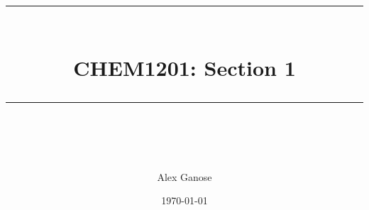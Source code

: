 \newcommand{\horrule}[1]{\rule{\linewidth}{#1}} %
\title{
  \normalfont \normalsize
  \horrule{0.5pt} \\[0.4cm]
  \huge CHEM1201: Section 1 \\
  \horrule{2pt} \\[0.5cm]
}

\author{Alex Ganose}
\date{\normalsize\today}